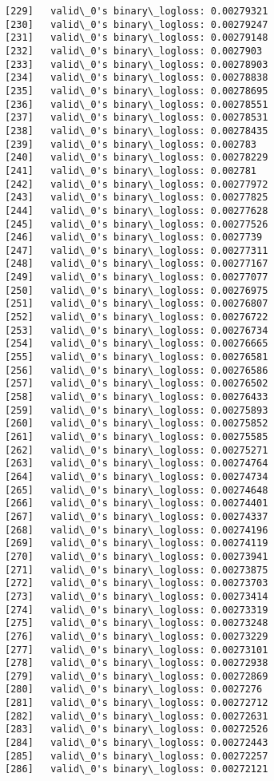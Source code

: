 \documentclass[11pt]{article}
\begin{document}
\begin{Verbatim}[commandchars=\\\{\}]
[229]	valid\_0's binary\_logloss: 0.00279321
[230]	valid\_0's binary\_logloss: 0.00279247
[231]	valid\_0's binary\_logloss: 0.00279148
[232]	valid\_0's binary\_logloss: 0.0027903
[233]	valid\_0's binary\_logloss: 0.00278903
[234]	valid\_0's binary\_logloss: 0.00278838
[235]	valid\_0's binary\_logloss: 0.00278695
[236]	valid\_0's binary\_logloss: 0.00278551
[237]	valid\_0's binary\_logloss: 0.00278531
[238]	valid\_0's binary\_logloss: 0.00278435
[239]	valid\_0's binary\_logloss: 0.002783
[240]	valid\_0's binary\_logloss: 0.00278229
[241]	valid\_0's binary\_logloss: 0.002781
[242]	valid\_0's binary\_logloss: 0.00277972
[243]	valid\_0's binary\_logloss: 0.00277825
[244]	valid\_0's binary\_logloss: 0.00277628
[245]	valid\_0's binary\_logloss: 0.00277526
[246]	valid\_0's binary\_logloss: 0.0027739
[247]	valid\_0's binary\_logloss: 0.00277311
[248]	valid\_0's binary\_logloss: 0.00277167
[249]	valid\_0's binary\_logloss: 0.00277077
[250]	valid\_0's binary\_logloss: 0.00276975
[251]	valid\_0's binary\_logloss: 0.00276807
[252]	valid\_0's binary\_logloss: 0.00276722
[253]	valid\_0's binary\_logloss: 0.00276734
[254]	valid\_0's binary\_logloss: 0.00276665
[255]	valid\_0's binary\_logloss: 0.00276581
[256]	valid\_0's binary\_logloss: 0.00276586
[257]	valid\_0's binary\_logloss: 0.00276502
[258]	valid\_0's binary\_logloss: 0.00276433
[259]	valid\_0's binary\_logloss: 0.00275893
[260]	valid\_0's binary\_logloss: 0.00275852
[261]	valid\_0's binary\_logloss: 0.00275585
[262]	valid\_0's binary\_logloss: 0.00275271
[263]	valid\_0's binary\_logloss: 0.00274764
[264]	valid\_0's binary\_logloss: 0.00274734
[265]	valid\_0's binary\_logloss: 0.00274648
[266]	valid\_0's binary\_logloss: 0.00274401
[267]	valid\_0's binary\_logloss: 0.00274337
[268]	valid\_0's binary\_logloss: 0.00274196
[269]	valid\_0's binary\_logloss: 0.00274119
[270]	valid\_0's binary\_logloss: 0.00273941
[271]	valid\_0's binary\_logloss: 0.00273875
[272]	valid\_0's binary\_logloss: 0.00273703
[273]	valid\_0's binary\_logloss: 0.00273414
[274]	valid\_0's binary\_logloss: 0.00273319
[275]	valid\_0's binary\_logloss: 0.00273248
[276]	valid\_0's binary\_logloss: 0.00273229
[277]	valid\_0's binary\_logloss: 0.00273101
[278]	valid\_0's binary\_logloss: 0.00272938
[279]	valid\_0's binary\_logloss: 0.00272869
[280]	valid\_0's binary\_logloss: 0.0027276
[281]	valid\_0's binary\_logloss: 0.00272712
[282]	valid\_0's binary\_logloss: 0.00272631
[283]	valid\_0's binary\_logloss: 0.00272526
[284]	valid\_0's binary\_logloss: 0.00272443
[285]	valid\_0's binary\_logloss: 0.00272257
[286]	valid\_0's binary\_logloss: 0.00272121

\end{Verbatim}
\end{document}
